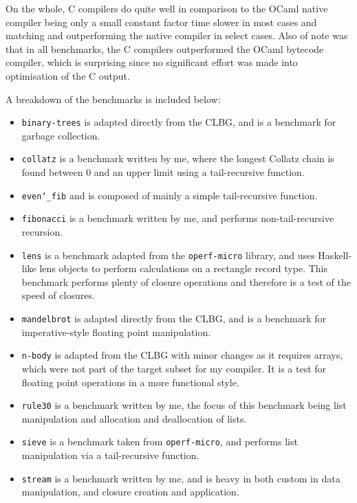 \documentclass[12pt,a4paper,twoside,openright]{report}
\begin{document}
On the whole, C compilers do quite well in comparison to the OCaml native 
compiler being only a small constant factor time slower in most cases and 
matching and outperforming the native compiler in select cases. Also of note 
was that in all benchmarks, the C compilers outperformed the OCaml bytecode 
compiler, which is surprising since no significant effort was made into 
optimisation of the C output.

A breakdown of the benchmarks is included below:

\begin{itemize}
    \item \texttt{binary-trees} is adapted directly from the CLBG, and is a 
    benchmark for garbage collection.
    
    \item \texttt{collatz} is a benchmark written by me, where the longest 
    Collatz chain is found between 0 and an upper limit using a tail-recursive 
    function.
    
    \item \texttt{even\char`_fib} and is composed of mainly a simple 
    tail-recursive function.
    
    \item \texttt{fibonacci} is a benchmark written by me, and performs 
    non-tail-recursive recursion.
    
    \item \texttt{lens} is a benchmark adapted from the \texttt{operf-micro} 
    library, and uses Haskell-like lens objects to perform calculations on a 
    rectangle record type. This benchmark performs plenty of closure operations 
    and therefore is a test of the speed of closures.
    
    \item \texttt{mandelbrot} is adapted directly from the CLBG, and is a 
    benchmark for imperative-style floating point manipulation.
    
    \item \texttt{n-body} is adapted from the CLBG with minor changes as it 
    requires arrays, which were not part of the target subset for my compiler. 
    It is a test for floating point operations in a more functional style.
    
    \item \texttt{rule30} is a benchmark written by me, the focus of this 
    benchmark being list manipulation and allocation and deallocation of lists.
    
    \item \texttt{sieve} is a benchmark taken from \texttt{operf-micro}, and 
    performs list manipulation via a tail-recursive function.
    
    \item \texttt{stream} is a benchmark written by me, and is heavy in both 
    custom in data manipulation, and closure creation and application.
    
\end{itemize}
\end{document}
